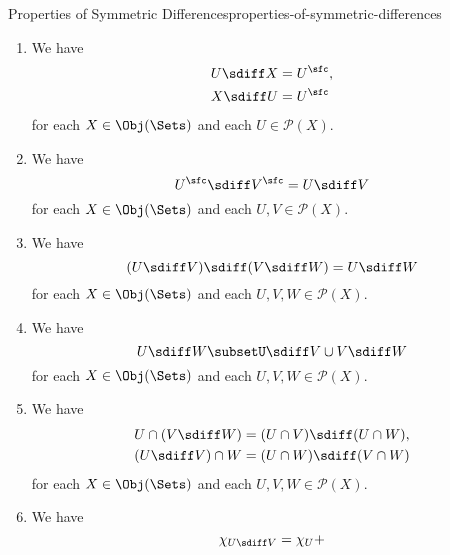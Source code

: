 \begin{proposition}{Properties of Symmetric Differences}{properties-of-symmetric-differences}
\begin{enumerate}
            for each $X\in\Obj(\Sets)$ and each $U\in\mathcal{P}(X)$.
        \item\label{properties-of-symmetric-differences-interaction-with-complements-2}We have
            \begin{align*}
                U\sdiff X &= U^{\sfc},\\%
                X\sdiff U &= U^{\sfc}%
            \end{align*}
            for each $X\in\Obj(\Sets)$ and each $U\in\mathcal{P}(X)$.
        \item\label{properties-of-symmetric-differences-interaction-with-complements-3}We have
            \[
                U^{\sfc}\sdiff V^{\sfc}%
                =%
                U\sdiff V%
            \]%
            for each $X\in\Obj(\Sets)$ and each $U,V\in\mathcal{P}(X)$.
        \item\label{properties-of-symmetric-differences-transitivity}We have
            \[
                (U\sdiff V)\sdiff(V\sdiff W)%
                =%
                U\sdiff W%
            \]%
            for each $X\in\Obj(\Sets)$ and each $U,V,W\in\mathcal{P}(X)$.
        \item\label{properties-of-symmetric-differences-the-triangle-inequality-for-symmetric-differences}We have
            \[
                U\sdiff W%
                \subset%
                U\sdiff V%
                \cup
                V\sdiff W%
            \]%
            for each $X\in\Obj(\Sets)$ and each $U,V,W\in\mathcal{P}(X)$.
        \item\label{properties-of-symmetric-differences-distributivity-over-intersections}We have
            \begin{align*}
                U\cap(V\sdiff W)  &= (U\cap V)\sdiff(U\cap W),\\
                (U\sdiff V)\cap W &= (U\cap W)\sdiff(V\cap W)
            \end{align*}
            for each $X\in\Obj(\Sets)$ and each $U,V,W\in\mathcal{P}(X)$.
        \item\label{properties-of-symmetric-differences-interaction-with-characteristic-functions}We have
            \[
                \chi_{U\sdiff V}%
                =%
                \chi_{U}%
                +%
\]
\end{enumerate}
\end{proposition}
